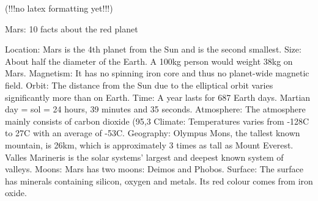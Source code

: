 (!!!no latex formatting yet!!!)

Mars: 10 facts about the red planet

Location: Mars is the 4th planet from the Sun and is the second smallest.
Size: About half the diameter of the Earth. A 100kg person would weight 38kg on Mars.
Magnetism: It has no spinning iron core and thus no planet-wide magnetic field.
Orbit: The distance from the Sun due to the elliptical orbit varies significantly more than on Earth.
Time: A year lasts for 687 Earth days. Martian day = sol = 24 hours, 39 minutes and 35 seconds.
Atmosphere: The atmosphere mainly consists of carbon dioxide (95,3%
Climate: Temperatures varies from -128C to 27C with an average of -53C.
Geography: Olympus Mons, the tallest known mountain, is 26km, which is approximately 3 times as tall as Mount Everest. Valles Marineris is the solar systems' largest and deepest known system of valleys.
Moons: Mars has two moons: Deimos and Phobos.
Surface: The surface has minerals containing silicon, oxygen and metals. Its red colour comes from iron oxide.